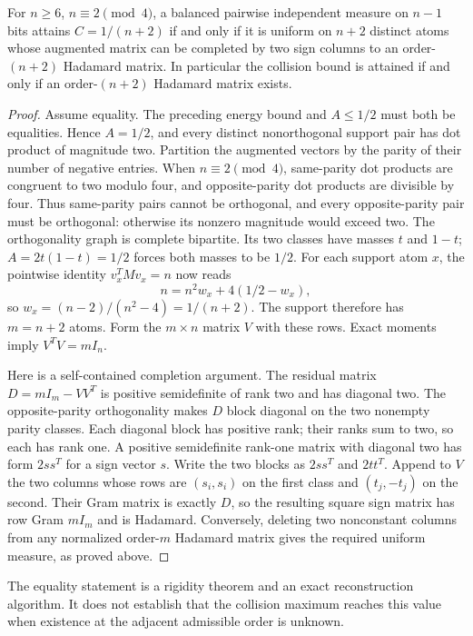 \begin{theorem}
\label{s10:thm:discrete-parity-equality}
For $n\ge6$, $n\equiv2\pmod4$, a balanced pairwise independent measure
on $n-1$ bits attains $C=1/(n+2)$ if and only if it is uniform on
$n+2$ distinct atoms whose augmented matrix can be completed by two
sign columns to an order-$(n+2)$ Hadamard matrix.
In particular the collision bound is attained if and only if an
order-$(n+2)$ Hadamard matrix exists.
\end{theorem}
\begin{proof}
Assume equality. The preceding energy bound and $A\le1/2$ must
both be equalities. Hence $A=1/2$, and every distinct nonorthogonal
support pair has dot product of magnitude two.
Partition the augmented vectors by the parity of their number of
negative entries. When $n\equiv2\pmod4$, same-parity dot products
are congruent to two modulo four, and opposite-parity dot products
are divisible by four. Thus same-parity pairs cannot be orthogonal,
and every opposite-parity pair must be orthogonal: otherwise its
nonzero magnitude would exceed two. The orthogonality graph is
complete bipartite. Its two classes have masses $t$ and $1-t$;
$A=2t(1-t)=1/2$ forces both masses to be $1/2$.
For each support atom $x$, the pointwise identity $v_x^TMv_x=n$
now reads
\[
 n=n^2w_x+4(1/2-w_x),
\]
so $w_x=(n-2)/(n^2-4)=1/(n+2)$. The support therefore has
$m=n+2$ atoms. Form the $m\times n$ matrix $V$ with these rows.
Exact moments imply $V^TV=mI_n$.

Here is a self-contained completion argument. The residual matrix
$D=mI_m-VV^T$ is positive semidefinite of rank two and has diagonal
two. The opposite-parity orthogonality makes $D$ block diagonal on
the two nonempty parity classes. Each diagonal block has positive
rank; their ranks sum to two, so each has rank one. A positive
semidefinite rank-one matrix with diagonal two has form $2ss^T$
for a sign vector $s$. Write the two blocks as $2ss^T$ and $2tt^T$.
Append to $V$ the two columns whose rows are $(s_i,s_i)$ on the
first class and $(t_j,-t_j)$ on the second. Their Gram matrix is
exactly $D$, so the resulting square sign matrix has row Gram
$mI_m$ and is Hadamard. Conversely, deleting two nonconstant columns
from any normalized order-$m$ Hadamard matrix gives the required
uniform measure, as proved above.
\end{proof}
The equality statement is a rigidity theorem and an exact reconstruction
algorithm. It does not establish that the collision maximum reaches
this value when existence at the adjacent admissible order is unknown.


